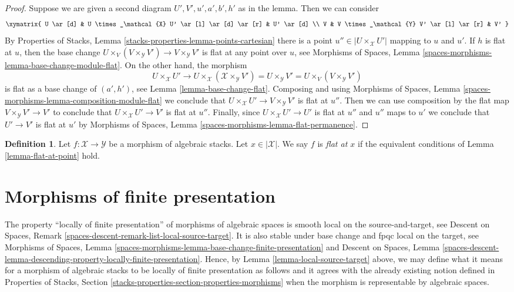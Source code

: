 \documentclass{stacks-project}
\theoremstyle{plain}
\theoremstyle{definition}
\newtheorem{definition}[subsection]{Definition}
\theoremstyle{remark}
\numberwithin{equation}{subsection}
\begin{document}
\begin{proof}
Suppose we are given a second diagram $U', V', u', a', b', h'$ as
in the lemma. Then we can consider
$$
\xymatrix{
U \ar[d] & U \times_\mathcal{X} U' \ar[l] \ar[d] \ar[r] & U' \ar[d] \\
V & V \times_\mathcal{Y} V' \ar[l] \ar[r] & V'
}
$$
By Properties of Stacks, Lemma \ref{stacks-properties-lemma-points-cartesian}
there is a point $u'' \in |U \times_\mathcal{X} U'|$ mapping
to $u$ and $u'$. If $h$ is flat at $u$, then the base change
$U \times_V (V \times_\mathcal{Y} V') \to V \times_\mathcal{Y} V'$
is flat at any point over $u$, see
Morphisms of Spaces, Lemma \ref{spaces-morphisms-lemma-base-change-module-flat}.
On the other hand, the morphism
$$
U \times_\mathcal{X} U' \to
U \times_\mathcal{X} (\mathcal{X} \times_\mathcal{Y} V') =
U \times_\mathcal{Y} V' =
U \times_V (V \times_\mathcal{Y} V')
$$
is flat as a base change of $(a', h')$, see Lemma \ref{lemma-base-change-flat}.
Composing and using
Morphisms of Spaces, Lemma \ref{spaces-morphisms-lemma-composition-module-flat}
we conclude that $U \times_\mathcal{X} U' \to V \times_\mathcal{Y} V'$
is flat at $u''$. Then we can use composition by the flat map
$V \times_\mathcal{Y} V' \to V'$ to conclude that
$U \times_\mathcal{X} U' \to V'$ is flat at $u''$.
Finally, since $U \times_\mathcal{X} U' \to U'$ is flat
at $u''$ and $u''$ maps to $u'$ we conclude that
$U' \to V'$ is flat at $u'$ by
Morphisms of Spaces, Lemma \ref{spaces-morphisms-lemma-flat-permanence}.
\end{proof}

\begin{definition}
\label{definition-flat-at-point}
Let $f : \mathcal{X} \to \mathcal{Y}$ be a morphism of algebraic stacks.
Let $x \in |\mathcal{X}|$. We say $f$ is {\it flat at $x$} if the
equivalent conditions of Lemma \ref{lemma-flat-at-point} hold.
\end{definition}





\section{Morphisms of finite presentation}
\label{section-finite-presentation}

\noindent
The property ``locally of finite presentation'' of morphisms of algebraic
spaces is smooth local on the source-and-target, see
Descent on Spaces, Remark \ref{spaces-descent-remark-list-local-source-target}.
It is also stable under base change and fpqc local on the target, see
Morphisms of Spaces,
Lemma \ref{spaces-morphisms-lemma-base-change-finite-presentation}
and
Descent on Spaces, Lemma
\ref{spaces-descent-lemma-descending-property-locally-finite-presentation}.
Hence, by
Lemma \ref{lemma-local-source-target}
above, we may define what it means for a morphism of algebraic stacks
to be locally of finite presentation as follows and it agrees with the already
existing notion defined in
Properties of Stacks,
Section \ref{stacks-properties-section-properties-morphisms}
when the morphism is representable by algebraic spaces.
\end{document}
